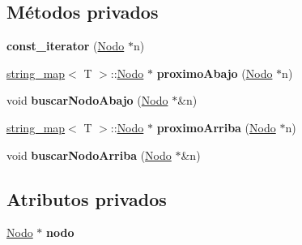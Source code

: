 \subsection*{Métodos privados}
\begin{DoxyCompactItemize}
\item 
\mbox{\label{classstring__map_1_1const__iterator_a9e7b24c524e269c5e910615e77548f01}} 
{\bfseries const\+\_\+iterator} (\mbox{\hyperlink{structstring__map_1_1Nodo}{Nodo}} $\ast$n)
\item 
\mbox{\label{classstring__map_1_1const__iterator_a98572c0b99cff2264bb5553ef421ce3a}} 
\mbox{\hyperlink{classstring__map}{string\+\_\+map}}$<$ T $>$\+::\mbox{\hyperlink{structstring__map_1_1Nodo}{Nodo}} $\ast$ {\bfseries proximo\+Abajo} (\mbox{\hyperlink{structstring__map_1_1Nodo}{Nodo}} $\ast$n)
\item 
\mbox{\label{classstring__map_1_1const__iterator_a23d6f9adf4ae7cc86a881b06461d74ed}} 
void {\bfseries buscar\+Nodo\+Abajo} (\mbox{\hyperlink{structstring__map_1_1Nodo}{Nodo}} $\ast$\&n)
\item 
\mbox{\label{classstring__map_1_1const__iterator_a4cec9e2ef862d583aedeeb3f84c3eecc}} 
\mbox{\hyperlink{classstring__map}{string\+\_\+map}}$<$ T $>$\+::\mbox{\hyperlink{structstring__map_1_1Nodo}{Nodo}} $\ast$ {\bfseries proximo\+Arriba} (\mbox{\hyperlink{structstring__map_1_1Nodo}{Nodo}} $\ast$n)
\item 
\mbox{\label{classstring__map_1_1const__iterator_ac28338d0b33ae631ec9bf4b3b49e851d}} 
void {\bfseries buscar\+Nodo\+Arriba} (\mbox{\hyperlink{structstring__map_1_1Nodo}{Nodo}} $\ast$\&n)
\end{DoxyCompactItemize}
\subsection*{Atributos privados}
\begin{DoxyCompactItemize}
\item 
\mbox{\label{classstring__map_1_1const__iterator_a6c5add96e5bd5706460a422a5596a992}} 
\mbox{\hyperlink{structstring__map_1_1Nodo}{Nodo}} $\ast$ {\bfseries nodo}
\end{DoxyCompactItemize}
